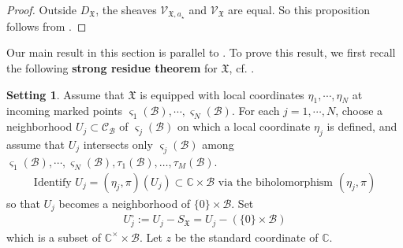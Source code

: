 \documentclass[11pt,b5paper,notitlepage]{article}
\theoremstyle{definition}
\newtheorem{rem}[df]{Remark}
\newtheorem{sett}[df]{Setting}
\theoremstyle{plain}
\newcommand{\fk}{\mathfrak}
\newcommand{\mc}{\mathcal}
\newcommand{\SV}{\mathscr{V}}
\newcommand{\scr}{\mathscr}
\newcommand{\DX}{D_{\fk X}}
\newcommand{\Vbb}{\mathbb V}
\newcommand{\Wbb}{\mathbb W}
\newcommand{\Cbb}{\mathbb C}
\newcommand{\<}{\left\langle}
\renewcommand{\>}{\right\rangle}
\newcommand{\MC}{\mathcal{C}}
\newcommand{\MB}{\mathcal{B}}
\newcommand{\fx}{\mathfrak{X}}
\newcommand{\SW}{\mathscr{W}}
\numberwithin{equation}{section}
\begin{document}
\begin{proof}
Outside $\DX$, the sheaves $\scr V_{\fk X,a_\star}$ and $\scr V_{\fk X}$ are equal. So this proposition follows from \cite[Prop. 6.2]{Gui-propagation}.  %
\end{proof} 

Our main result in this section is parallel to \cite[Thm. 7.1]{Gui-propagation}. %
To prove this result, we first  recall the following \textbf{strong residue theorem} for $\fk X$, cf. \cite[Thm. A.1]{Gui-propagation}. 


\begin{sett}\label{lb12}
Assume that $\fx$ is equipped with local coordinates $\eta_1,\cdots,\eta_N$ at incoming marked points $\varsigma_1(\MB),\cdots,\varsigma_N(\MB)$. For each $j=1,\cdots, N$, choose a neighborhood $U_j\subset \MC_{\MB}$ of $\varsigma_j(\MB)$ on which a local coordinate $\eta_j$ is defined, and assume that $U_j$ intersects only $\varsigma_j(\MB)$ among $\varsigma_1(\MB),\cdots,\varsigma_N(\MB),\tau_1(\mc B),\dots,\tau_M(\mc B)$. 
\begin{gather}
\text{Identify $U_j=(\eta_j,\pi)(U_j)\subset \Cbb\times \MB$ via the biholomorphism $(\eta_j,\pi)$}
\end{gather}
so that $U_j$ becomes a neighborhood of $\{0\}\times \MB$. Set
\begin{align}
U_j^\circ:=U_j-S_\fx=U_j-(\{0\}\times \MB)
\end{align}
which is a subset of $\Cbb^\times \times \MB$. Let $z$ be the standard coordinate of $\Cbb$.
\end{sett}
\end{document}
